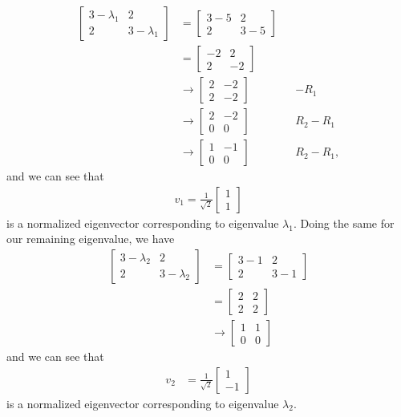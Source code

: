 \documentclass[10pt,a4paper]{article}
\theoremstyle{definition}
\begin{document}
\begin{align*}
\begin{bmatrix}
3 - \lambda_1 & 2\\
2 & 3 - \lambda_1
\end{bmatrix} &= \begin{bmatrix}
3 - 5 & 2\\
2 & 3 - 5
\end{bmatrix}\\
&= \begin{bmatrix}
-2 & 2\\
2 & -2
\end{bmatrix}\\
&\to \begin{bmatrix}
2 & -2\\
2 & -2
\end{bmatrix} && -R_1\\
&\to \begin{bmatrix}
2 & -2\\
0 & 0
\end{bmatrix} && R_2 - R_1\\
&\to \begin{bmatrix}
1 & -1\\
0 & 0
\end{bmatrix} && R_2 - R_1,
\end{align*}
and we can see that
\begin{align*}
v_1 = \frac{1}{\sqrt{2}} \begin{bmatrix}
1\\
1
\end{bmatrix}
\end{align*}
is a normalized eigenvector corresponding to eigenvalue $\lambda_1$. Doing the same for our remaining eigenvalue, we have
\begin{align*}
\begin{bmatrix}
3 - \lambda_2 & 2\\
2 & 3 - \lambda_2
\end{bmatrix} &= \begin{bmatrix}
3 - 1 & 2\\
2 & 3 - 1
\end{bmatrix}\\
&= \begin{bmatrix}
2 & 2\\
2 & 2
\end{bmatrix}\\
&\to \begin{bmatrix}
1 & 1\\
0 & 0
\end{bmatrix}
\end{align*}
and we can see that 
\begin{align*}
v_2 &= \frac{1}{\sqrt{2}} \begin{bmatrix}
1\\
-1
\end{bmatrix}
\end{align*}
is a normalized eigenvector corresponding to eigenvalue $\lambda_2$.
\end{document}
